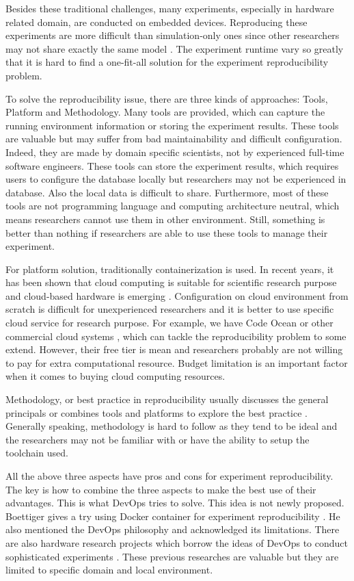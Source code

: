 \documentclass[10pt, conference, compsocconf]{IEEEtran}
\begin{document}
Besides these traditional challenges, many experiments, especially in hardware related domain, are conducted on
embedded devices. Reproducing these experiments are more difficult than simulation-only ones since other researchers may not share exactly the same model \cite{report2017}. The experiment runtime vary so greatly that it is hard to find a
one-fit-all solution for the experiment reproducibility problem.

To solve the reproducibility issue, there are three kinds of approaches: Tools, Platform and Methodology. Many tools \cite{greff2017sacred} are provided, which can capture the running environment information or storing the experiment results. These tools are valuable but may suffer from bad maintainability and difficult configuration. Indeed, they are made by domain specific scientists, not by experienced full-time software engineers. These tools can store the experiment results, which requires users to configure the database locally but researchers may not be experienced in database. Also the local data is difficult to share. Furthermore, most of these tools are not programming language and computing architecture neutral, which means researchers cannot use them in other environment. Still, something is better than nothing if researchers are able to use these tools to manage their experiment.

For platform solution, traditionally containerization is used. In recent years, it has been shown that cloud computing is suitable for scientific research purpose \cite{Howe12} and cloud-based hardware is emerging \cite{cloudhard}. Configuration on cloud environment from scratch is difficult for unexperienced researchers and it is better to use specific cloud service for research purpose. For example, we have Code Ocean or other commercial cloud systems \cite{perkel2018data}, which can tackle the reproducibility problem to some extend. However, their free tier is mean and researchers probably are not willing to pay for extra computational resource. Budget limitation is an important factor when it comes to buying cloud computing resources.

Methodology, or best practice in reproducibility usually discusses the general principals \cite{stodden2014best} or combines tools and platforms to explore the best practice \cite{QashaCW16}. Generally speaking, methodology is hard to follow as they tend to be ideal and the researchers may not be familiar with or have the ability to setup the toolchain used.  

All the above three aspects have pros and cons for experiment reproducibility. The key is how to combine the three aspects to make the best use of their advantages. This is what DevOps tries to solve. This idea is not newly proposed. Boettiger gives a try using Docker container for experiment reproducibility \cite{Boettiger15}.
He also mentioned the DevOps philosophy and acknowledged its limitations.
There are also hardware research projects which borrow the ideas of DevOps to conduct sophisticated experiments \cite{chwalisz2019walker}. These previous researches are valuable but they are limited to specific domain and local environment.
\end{document}
